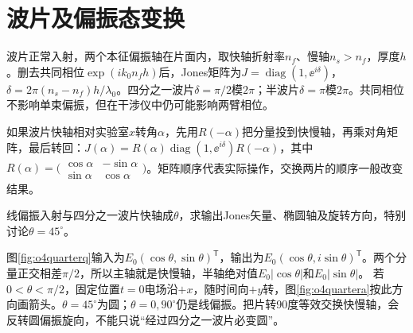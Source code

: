 
\section{波片及偏振态变换}\label{th:o4plates}
波片正常入射，两个本征偏振轴在片面内，取快轴折射率$n_f$、慢轴$n_s>n_f$，厚度$h$。删去共同相位$\exp(ik_0n_fh)$后，Jones矩阵为$J=\operatorname{diag}(1,\ee^{i\delta})$，$\delta=2\pi(n_s-n_f)h/\lambda_0$。四分之一波片$\delta=\pi/2$模$2\pi$；半波片$\delta=\pi$模$2\pi$。共同相位不影响单束偏振，但在干涉仪中仍可能影响两臂相位。

如果波片快轴相对实验室$x$转角$\alpha$，先用$R(-\alpha)$把分量投到快慢轴，再乘对角矩阵，最后转回：$J(\alpha)=R(\alpha)\operatorname{diag}(1,\ee^{i\delta})R(-\alpha)$，其中$R(\alpha)=\bigl(\begin{smallmatrix}\cos\alpha&-\sin\alpha\\\sin\alpha&\cos\alpha\end{smallmatrix}\bigr)$。矩阵顺序代表实际操作，交换两片的顺序一般改变结果。

\begin{example}\label{ex:o4quarter}
线偏振入射与四分之一波片快轴成$\theta$，求输出Jones矢量、椭圆轴及旋转方向，特别讨论$\theta=45^\circ$。
\end{example}
\begin{solution}
图\ref{fig:o4quarterq}输入为$E_0(\cos\theta,\sin\theta)^{\mathsf T}$，输出为$E_0(\cos\theta,i\sin\theta)^{\mathsf T}$。两个分量正交相差$\pi/2$，所以主轴就是快慢轴，半轴绝对值$E_0|\cos\theta|$和$E_0|\sin\theta|$。
若$0<\theta<\pi/2$，固定位置$t=0$电场沿$+x$，随时间向$+y$转，图\ref{fig:o4quartera}按此方向画箭头。$\theta=45^\circ$为圆；$\theta=0,90^\circ$仍是线偏振。把片转90度等效交换快慢轴，会反转圆偏振旋向，不能只说“经过四分之一波片必变圆”。
\end{solution}

